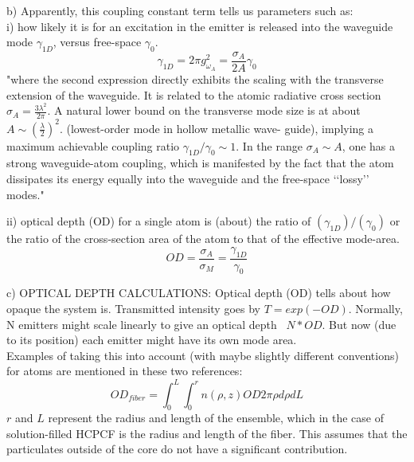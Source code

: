 b) Apparently, this coupling constant term tells us parameters such as:\\
i) how likely it is for an excitation in the emitter is released into the waveguide mode $\gamma_{1D}$, versus free-space $\gamma_0$. \cite{mazoni}
\begin{equation}
	\gamma_{1D} = 2\pi g^2_{\omega_A}  = \frac{\sigma_A}{2A}\gamma_0
\end{equation}
"where the second expression directly exhibits the scaling with the transverse extension of the waveguide. It is related to the atomic radiative cross section $\sigma_A = \frac{3\lambda^2}{2\pi}$. A natural lower bound on the transverse mode size is at about $A \sim (\frac{\lambda}{2})^2$. (lowest-order mode in hollow metallic wave- guide), implying a maximum achievable coupling ratio $\gamma_{1D}/\gamma_0 \sim 1$. In the range $\sigma_A \sim A$, one has a strong waveguide-atom coupling, which is manifested by the fact that the atom dissipates its energy equally into the waveguide and the free-space ‘‘lossy’’ modes."\cite{domokos}

ii) optical depth (OD) for a single atom is (about) the ratio of $ (\gamma_{1D})/ (\gamma_{0})$ or the ratio of the cross-section area of the atom to that of the effective mode-area. 
\begin{equation}
 	OD = \frac{\sigma_A}{\sigma_M} = \frac{\gamma_{1D}}{\gamma_0}
\end{equation}

c) OPTICAL DEPTH CALCULATIONS: Optical depth (OD) tells about how opaque the system is. Transmitted intensity goes by $T = exp(-OD)$. Normally, N emitters might scale linearly to give an optical depth ~$N*OD$. But now (due to its position) each emitter might have its own mode area.\\

Examples of taking this into account (with maybe slightly different conventions) for atoms are mentioned in these two references\cite{bajcsy, hilton}: 
\begin{equation}
	OD_{fiber} = \int^L_0 \int^{r}_0 n(\rho, z) OD 2\pi \rho d\rho dL
\end{equation}
$r$ and $L$ represent the radius and length of the ensemble, which in the case of solution-filled HCPCF is the radius and length of the fiber. This assumes that the particulates outside of the core do not have a significant contribution. 

